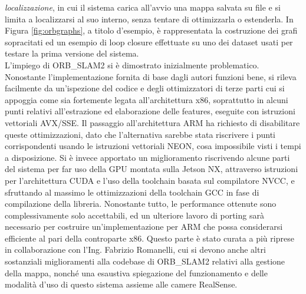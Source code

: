 \emph{localizzazione}, in cui il sistema carica all'avvio una mappa salvata su file e si limita a localizzarsi al suo interno, senza tentare di ottimizzarla o estenderla. In Figura \ref{fig:orbgraphs}, a titolo d'esempio, è rappresentata la costruzione dei grafi sopracitati ed un esempio di loop closure effettuate su uno dei dataset usati per testare la prima versione del sistema.\\
L'impiego di ORB\_SLAM2 si è dimostrato inizialmente problematico. Nonostante l'implementazione fornita di base dagli autori funzioni bene, si rileva facilmente da un'ispezione del codice e degli ottimizzatori di terze parti cui si appoggia come sia fortemente legata all'architettura x86, soprattutto in alcuni punti relativi all'estrazione ed elaborazione delle features, eseguite con istruzioni vettoriali AVX/SSE. Il passaggio all'architettura ARM ha richiesto di disabilitare queste ottimizzazioni, dato che l'alternativa sarebbe stata riscrivere i punti corrispondenti usando le istruzioni vettoriali NEON, cosa impossibile visti i tempi a disposizione. Si è invece apportato un miglioramento riscrivendo alcune parti del sistema per far uso della GPU montata sulla Jetson NX, attraverso istruzioni per l'architettura CUDA e l'uso della toolchain basata sul compilatore NVCC, e sfruttando al massimo le ottimizzazioni della toolchain GCC in fase di compilazione della libreria. Nonostante tutto, le performance ottenute sono complessivamente solo accettabili, ed un ulteriore lavoro di porting sarà necessario per costruire un'implementazione per ARM che possa considerarsi efficiente al pari della controparte x86. Questo parte è stato curata a più riprese in collaborazione con l'Ing. Fabrizio Romanelli, cui si devono anche altri sostanziali miglioramenti alla codebase di ORB\_SLAM2 relativi alla gestione della mappa, nonché una esaustiva spiegazione del funzionamento e delle modalità d'uso di questo sistema assieme alle camere RealSense.\\
